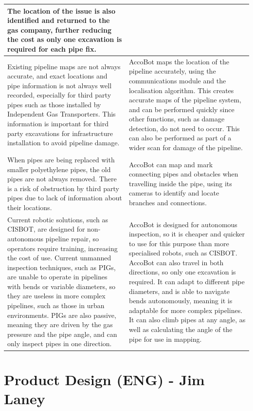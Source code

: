 \documentclass[11pt]{article}		%
\begin{document}
{\begin{longtable}[c]{| m{} | m{} |}
			The location of the issue is also identified and returned to the gas company, further reducing the cost as only one excavation is required for each pipe fix.
			\\
			\hline
			\rowcolor{rowGrey}
			Existing pipeline maps are not always accurate, and exact locations and pipe information is not always well recorded, especially for third party pipes such as those installed by Independent Gas Transporters.
			This information is important for third party excavations for infrastructure installation to avoid pipeline damage.
			& 
			AccoBot maps the location of the pipeline accurately, using the communications module and the localisation algorithm.
			This creates accurate maps of the pipeline system, and can be performed quickly since other functions, such as damage detection, do not need to occur.
			This can also be performed as part of a wider scan for damage of the pipeline.
			\\
			\hline
			\rowcolor{rowGrey}
			When pipes are being replaced with smaller polyethylene pipes, the old pipes are not always removed.
			There is a risk of obstruction by third party pipes due to lack of information about their locations.
			& 
			AccoBot can map and mark connecting pipes and obstacles when travelling inside the pipe, using its cameras to identify and locate branches and connections.
			\\
			\hline
			\rowcolor{rowGrey} Current robotic solutions, such as CISBOT, are designed for non-autonomous pipeline repair, so operators require training, increasing the cost of use.
			Current unmanned inspection techniques, such as PIGs, are unable to operate in pipelines with bends or variable diameters, so they are useless in more complex pipelines, such as those in urban environments.
			PIGs are also passive, meaning they are driven by the gas pressure and the pipe angle, and can only inspect pipes in one direction.
			&
			AccoBot is designed for autonomous inspection, so it is cheaper and quicker to use for this purpose than more specialised robots, such as CISBOT.
			AccoBot can also travel in both directions, so only one excavation is required.
			It can adapt to different pipe diameters, and is able to navigate bends autonomously, meaning it is adaptable for more complex pipelines.
			It can also climb pipes at any angle, as well as calculating the angle of the pipe for use in mapping.
			\label{solutionTable}
		\end{longtable}
		}
		
		\section[Product Design - ENG]{Product Design (ENG) - Jim Laney}
        
\end{document}
